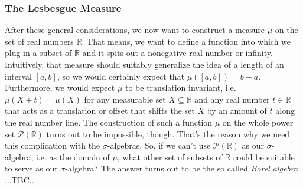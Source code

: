 




\subsubsection{The Lesbesgue Measure}
After these general considerations, we now want to construct a measure $\mu$ on the set of real numbers $\mathbb{R}$. That means, we want to define a function into which we plug in a subset of $\mathbb{R}$ and it spits out a nonegative real number or infinity. Intuitively, that measure should suitably generalize the idea of a length of an interval $[a,b]$, so we would certainly expect that $\mu([a,b]) = b-a$. Furthermore, we would expect $\mu$ to be translation invariant, i.e. $\mu(X + t) = \mu(X)$ for any measurable set $X \subseteq \mathbb{R}$ and any real number $t \in \mathbb{R}$ that acts as a translation or offset that shifts the set $X$ by an amount of $t$ along the real number line. The construction of such a function $\mu$ on the whole power set $\mathcal{P}(\mathbb{R})$ turns out to be impossible, though. That's the reason why we need this complication with the $\sigma$-algebras. So, if we can't use $\mathcal{P}(\mathbb{R})$ as our $\sigma$-algebra, i.e. as the domain of $\mu$, what other set of subsets of $\mathbb{R}$ could be suitable to serve as our $\sigma$-algebra? The answer turns out to be the so called \emph{Borel algebra} ...TBC...






